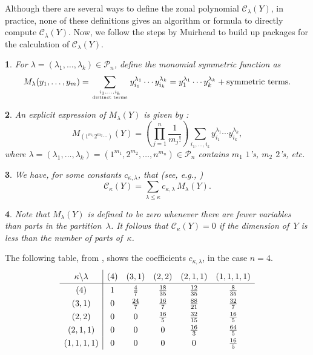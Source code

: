 \documentclass[smallextended]{svjour3}
\newtheorem{thm}{\protect\theoremname}
\newtheorem{defn}[thm]{\protect\definitionname}
\newtheorem{rem}[thm]{\protect\remarkname}
\providecommand{\definitionname}{Definition}
\providecommand{\remarkname}{Remark}
\providecommand{\theoremname}{Theorem}
\begin{document}
Although there are several ways to define the zonal polynomial $\mathcal{C}_{\lambda}(Y)$,
in practice, none of these definitions gives an algorithm or formula
to directly compute $\mathcal{C}_{\lambda}(Y)$. Now, we
follow the steps by Muirhead \cite{Muirhead} to build up packages for the
calculation of $\mathcal{C}_{\lambda}(Y)$.
\begin{defn}
For $\lambda=(\lambda_1,\ldots,\lambda_k)\in\mathcal{P}_{n}$,
define the \emph{monomial symmetric function} as 
\begin{equation}
  M_{\lambda}(y_{1},\ldots,y_{m}) =
  \sum_{\genfrac{}{}{0pt}{}{i_{1},\ldots,i_{k}}{\text{distinct terms}}}y_{i_{1}}^{\lambda_{1}}\cdots y_{i_{k}}^{\lambda_{k}}=y_{1}^{\lambda_{1}}\cdots y_{k}^{\lambda_{k}}+\text{symmetric terms}.\label{eq:MZonal}
\end{equation}
\end{defn}
\begin{rem}
An explicit expression of $M_{\lambda}(Y)$ is given by
\cite[eq.~6]{Takemura}:
\begin{equation}\label{eq:MZonalComputation}
  M_{(1^{m_{1}}2^{m_{2}}\cdots)}(Y)=\left(\prod_{j=1}^{n}\frac{1}{m_{j}!}\right)
  \sum_{i_{1},\ldots,i_{k}}y_{i_{1}}^{\lambda_{1}}\cdots y_{i_{k}}^{\lambda_{k}},
\end{equation}
where $\lambda=(\lambda_1,\ldots,\lambda_k)=(1^{m_1},2^{m_2},\ldots,n^{m_n})\in\mathcal{P}_n$ contains $m_1$ $1$'s, $m_2$ $2$'s, etc. 
\end{rem}
\begin{thm}
We have,  for some constants $c_{\kappa,\lambda}$, that (see, e.g., \cite[eq.~13]{Muirhead})
\begin{equation}\label{eq:CInTermsOfM}
  \mathcal{C}_{\kappa}(Y)=\sum_{\lambda\leq\kappa}c_{\kappa,\lambda}\,M_{\lambda}(Y).
\end{equation}
\end{thm}
\begin{rem}\label{rem:polyzero}
  Note that $M_\lambda(Y)$ is defined to be zero whenever there are fewer
  variables than parts in the partition~$\lambda$. It follows that
  $\mathcal{C}_{\kappa}(Y)=0$ if the dimension of~$Y$ is less than the
  number of parts of~$\kappa$.
\end{rem}
\begin{example}\label{Tables}
The following table, from \cite[p.~238]{Muirhead}, shows
the coefficients $c_{\kappa,\lambda}$, in the case $n=4$.
\[
\def\arraystretch{1.3}
\begin{array}{c|ccccc}
\kappa\backslash\lambda & \left(4\right) & \left(3,1\right) & \left(2,2\right) & \left(2,1,1\right) & \left(1,1,1,1\right)\\ \hline
\left(4\right) & 1 & \frac{4}{7} & \frac{18}{35} & \frac{12}{35} & \frac{8}{35}\\
\left(3,1\right) & 0 & \frac{24}{7} & \frac{16}{7} & \frac{88}{21} & \frac{32}{7}\\
\left(2,2\right) & 0 & 0 & \frac{16}{5} & \frac{32}{15} & \frac{16}{5}\\
\left(2,1,1\right) & 0 & 0 & 0 & \frac{16}{3} & \frac{64}{5}\\
\left(1,1,1,1\right) & 0 & 0 & 0 & 0 & \frac{16}{5}
\end{array}
\]
\end{example}
\end{document}
